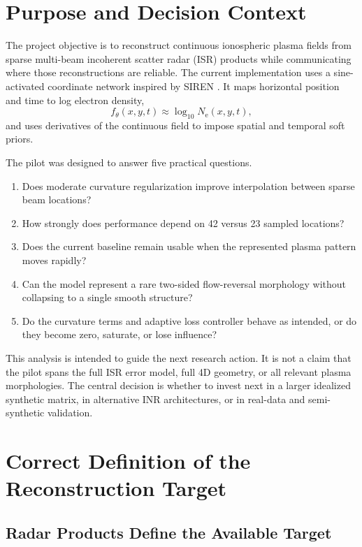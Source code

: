 \documentclass[11pt]{article}
\newcommand{\Ne}{N_{\mathrm e}}
\begin{document}
\section{Purpose and Decision Context}

The project objective is to reconstruct continuous ionospheric plasma fields from sparse multi-beam
incoherent scatter radar (ISR) products while communicating where those reconstructions are reliable.
The current implementation uses a sine-activated coordinate network inspired by SIREN
\cite{Sitzmann2020SIREN}. It maps horizontal position and time to log electron density,
\begin{equation}
  f_{\theta}(x,y,t) \approx \log_{10}\Ne(x,y,t),
\end{equation}
and uses derivatives of the continuous field to impose spatial and temporal soft priors.

The pilot was designed to answer five practical questions.
\begin{enumerate}
  \item Does moderate curvature regularization improve interpolation between sparse beam locations?
  \item How strongly does performance depend on 42 versus 23 sampled locations?
  \item Does the current baseline remain usable when the represented plasma pattern moves rapidly?
  \item Can the model represent a rare two-sided flow-reversal morphology without collapsing to a single
  smooth structure?
  \item Do the curvature terms and adaptive loss controller behave as intended, or do they become zero,
  saturate, or lose influence?
\end{enumerate}

This analysis is intended to guide the next research action. It is not a claim that the pilot spans the
full ISR error model, full 4D geometry, or all relevant plasma morphologies. The central decision is whether
to invest next in a larger idealized synthetic matrix, in alternative INR architectures, or in real-data and
semi-synthetic validation.

\section{Correct Definition of the Reconstruction Target}

\subsection{Radar Products Define the Available Target}
\end{document}
